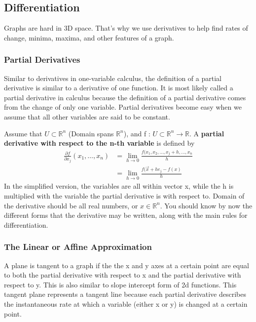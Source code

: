 \documentclass{article}
\begin{document}
\subsection{Differentiation}
Graphs are hard in 3D space. That's why we use derivatives to help find rates of change, minima, maxima, and other features of a graph.
\subsubsection{Partial Derivatives}
Similar to derivatives in one-variable calculus, the definition of a partial derivative is similar to a derivative of one function. It is most likely called a partial derivative in calculus because the definition of a partial derivative comes from the change of only one variable. Partial derivatives become easy when we assume that all other variables are said to be constant. \newline

Assume that $U \subset \mathbb{R}^n$ (Domain spans $\mathbb{R}^n$), and 
f : $U \subset \mathbb{R}^n \rightarrow \mathbb{R}$. A \textbf{partial derivative with respect to the n-th variable} is defined by 
\begin{align}
  \frac{\partial f}{\partial x_j}(x_1, \hdots, x_n) &= \lim_{h \rightarrow 0} \frac{f(x_1,x_2,\hdots,x_j + h, \hdots, x_n}{h}\\
  &= \lim_{h \rightarrow 0} \frac{f(\vec{x} + he_j - f(x)}{h}
\end{align}
In the simplified version, the variables are all within vector x, while the h is multiplied with the variable the partial derivative is with respect to. Domain of the derivative should be all real numbers, or $x \in \mathbb{R}^n$.\newline
You should know by now the different forms that the derivative may be written, along with the main rules for differentiation.
\subsubsection{The Linear or Affine Approximation}
A plane is tangent to a graph if the the x and y axes at a certain point are equal to both the partial derivative with respect to x and the partial derivative with respect to y. This is also similar to slope intercept form of 2d functions. This tangent plane represents a tangent line because each partial derivative describes the instantaneous rate at which a variable (either x or y) is changed at a certain point.\newline
\end{document}

